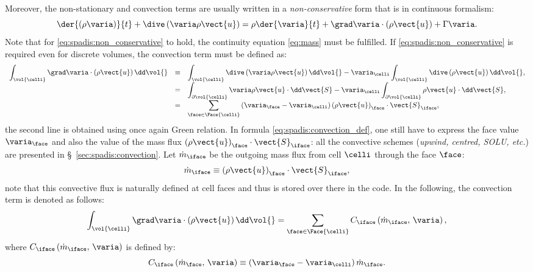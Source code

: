 Moreover, the non-stationary and convection terms are usually written in a \emph{non-conservative} form that is in continuous formalism:
\begin{equation}\label{eq:spadis:non_conservative}
 \der{ \left( \rho\varia \right)}{t} + \dive \left(  \varia  \rho \vect{u}\right) = \rho \der{\varia }{t} + \grad \varia \cdot \left( \rho \vect{u}\right) + \Gamma \varia.
 \end{equation}
 Note that for \eqref{eq:spadis:non_conservative} to hold, the continuity equation \eqref{eq:mass} must be fulfilled. 
 If \eqref{eq:spadis:non_conservative} is required even for discrete volumes, the convection term must be defined as:
 \begin{equation}\label{eq:spadis:convection_def}
 \begin{array}{r c l}
\displaystyle \int_{\vol{\celli}} \grad \varia \cdot \left( \rho \vect{u} \right) \dd \vol{} &\equiv &
\displaystyle \int_{\vol{\celli}}  \dive \left( \varia \rho \vect{u} \right) \dd \vol{}  - \varia_\celli  \int_{\vol{\celli}} \dive \left(\rho \vect{u} \right) \dd \vol{}, \\
 &=& 
 \displaystyle \int_{ \partial \vol{\celli}}   \varia \rho \vect{u} \cdot \dd \vect{S}  - \varia_\celli  \int_{ \partial \vol{\celli}} \rho \vect{u} \cdot \dd \vect{S}, \\
 &=& 
\displaystyle \sum_{\face \in \Face{\celli}} \left(\varia_\face - \varia_\celli \right) \left(\rho \vect{u}\right)_\face \cdot \vect{S}_{\iface},
 \end{array}
 \end{equation}
the second line is obtained using once again Green relation. In formula \eqref{eq:spadis:convection_def}, one still have to express the face value
 $\varia_\face$ and also the value of the mass flux $\left(\rho \vect{u}\right)_\face\cdot \vect{S}_{\iface}$: all the convective schemes (\emph{upwind, centred, SOLU, etc.}) are presented in \S~\ref{sec:spadis:convection}. Let $\dot{m}_\iface$ be the outgoing
 mass flux from cell $\celli$ through the face $\face$:
  \begin{equation}\label{eq:spadis:massflux_def}
\dot{m}_\iface \equiv \left(\rho \vect{u}\right)_\face \cdot \vect{S}_{\iface},
 \end{equation}
note that this convective flux is naturally defined at cell faces and thus is stored over there in the code. In the following, the convection term is denoted as follows:
\begin{equation}\label{eq:spadis:convection_notation}
\displaystyle \int_{\vol{\celli}} \grad \varia \cdot \left( \rho \vect{u} \right) \dd \vol{} 
=
\displaystyle \sum_{\face \in \Face{\celli}} C_\iface \left( \dot{m}_\iface , \, \varia \right),
 \end{equation}
where $C_\iface \left(  \dot{m}_\iface  , \, \varia\right)$ is defined by:
\begin{equation}\label{eq:spadis:convection_flux}
C_\iface \left(\dot{m}_\face , \, \varia \right) \equiv  \left(\varia_\face - \varia_\celli \right) \dot{m}_\iface.
 \end{equation}

